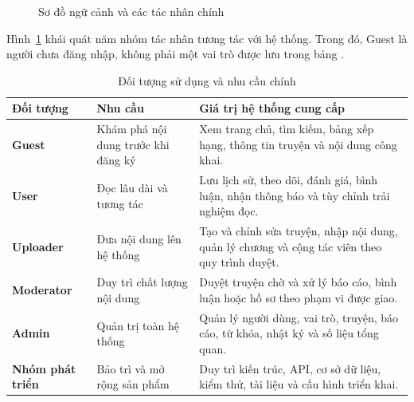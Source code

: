 \begin{figure}[H]
\centering
{}
\caption{Sơ đồ ngữ cảnh và các tác nhân chính}
\label{fig:system-context}
\end{figure}

Hình~\ref{fig:system-context} khái quát năm nhóm tác nhân tương tác với hệ thống. Trong đó, Guest là người chưa đăng nhập, không phải một vai trò được lưu trong bảng .

\begin{table}[H]
\centering
\caption{Đối tượng sử dụng và nhu cầu chính}
\label{tab:stakeholders}
\small
\renewcommand{\arraystretch}{1.08}
\begin{tabularx}{\textwidth}{|>{\bfseries\RaggedRight\arraybackslash}p{2.7cm}|X|X|}
\hline
\textbf{Đối tượng} & \textbf{Nhu cầu} & \textbf{Giá trị hệ thống cung cấp} \\
\hline
Guest & Khám phá nội dung trước khi đăng ký & Xem trang chủ, tìm kiếm, bảng xếp hạng, thông tin truyện và nội dung công khai. \\
\hline
User & Đọc lâu dài và tương tác & Lưu lịch sử, theo dõi, đánh giá, bình luận, nhận thông báo và tùy chỉnh trải nghiệm đọc. \\
\hline
Uploader & Đưa nội dung lên hệ thống & Tạo và chỉnh sửa truyện, nhập nội dung, quản lý chương và cộng tác viên theo quy trình duyệt. \\
\hline
Moderator & Duy trì chất lượng nội dung & Duyệt truyện chờ và xử lý báo cáo, bình luận hoặc hồ sơ theo phạm vi được giao. \\
\hline
Admin & Quản trị toàn hệ thống & Quản lý người dùng, vai trò, truyện, báo cáo, từ khóa, nhật ký và số liệu tổng quan. \\
\hline
Nhóm phát triển & Bảo trì và mở rộng sản phẩm & Duy trì kiến trúc, API, cơ sở dữ liệu, kiểm thử, tài liệu và cấu hình triển khai. \\
\hline
\end{tabularx}
\end{table}
\clearpage
